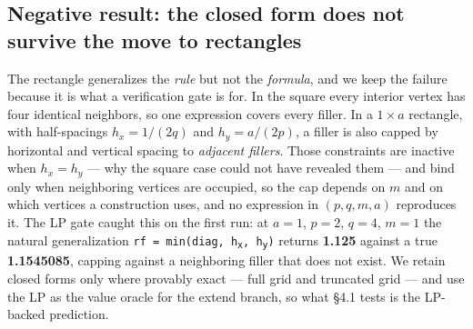 \documentclass[11pt]{article}
\begin{document}
\subsection{Negative result: the closed form does not survive the move to rectangles}

The rectangle generalizes the \textit{rule} but not the \textit{formula}, and we keep the failure because it
is what a verification gate is for. In the square every interior vertex has four identical
neighbors, so one expression covers every filler. In a $1 \times a$ rectangle, with half-spacings
$h_x = 1/(2q)$ and $h_y = a/(2p)$, a filler is also capped by horizontal and vertical spacing to
\textit{adjacent fillers}. Those constraints are inactive when $h_x = h_y$ --- why the square case could not
have revealed them --- and bind only when neighboring vertices are occupied, so the cap depends
on $m$ and on which vertices a construction uses, and no expression in $(p, q, m, a)$ reproduces
it. The LP gate caught this on the first run: at $a = 1$, $p = 2$, $q = 4$, $m = 1$ the natural
generalization \texttt{rf = min(diag, h\textsubscript{x}, h\textsubscript{y})} returns \textbf{1.125} against a true \textbf{1.1545085}, capping
against a neighboring filler that does not exist. We retain closed forms only where provably
exact --- full grid and truncated grid --- and use the LP as the value oracle for the extend branch,
so what \S4.1 tests is the LP-backed prediction.
\end{document}
